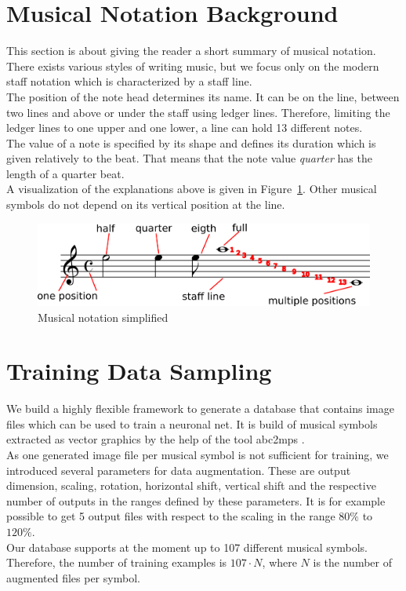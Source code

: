 \documentclass[twocolumn]{article}
\begin{document}
\section{Musical Notation Background}
This section is about giving the reader a short summary of musical notation.\\
There exists various styles of writing music, but we focus only on the modern staff notation which is characterized by a staff line. \\
The position of the note head determines its name. It can be on the line, between two lines and above or under the staff using ledger lines. Therefore, limiting the ledger lines to one upper and one lower, a line can hold 13 different notes. \\
The value of a note is specified by its shape and defines its duration which is given relatively to the beat. That means that the note value \textit{quarter} has the length of a quarter beat. \\
A visualization of the explanations above is given in Figure~\ref{musical_notation}. 
Other musical symbols do not depend on its vertical position at the line. 


\begin{figure}
 \includegraphics[width=\linewidth]{notation.png}
 \caption{Musical notation simplified}
 \label{musical_notation}
\end{figure}

\section{Training Data Sampling}
We build a highly flexible framework to generate a database that contains image files which can be used to train a neuronal net. It is build of musical symbols extracted as vector graphics by the help of the tool abc2mps \citet{abc2mps}. \\
As one generated image file per musical symbol is not sufficient for training, we introduced several parameters for data augmentation. These are output dimension, scaling, rotation, horizontal shift, vertical shift and the respective number of outputs in the ranges defined by these parameters. It is for example possible to get 5 output files with respect to the scaling in the range $80\%$ to $120\%$. \\
Our database supports at the moment up to 107 different musical symbols. Therefore, the number of training examples is $107 \cdot N$, where $N$ is the number of augmented files per symbol. 
\end{document}
